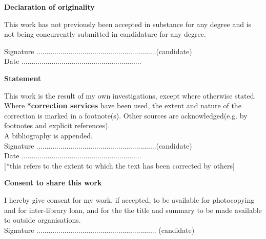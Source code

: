 \thispagestyle{empty}

\begin{center}
    {\LARGE\bf Declaration of originality}
\end{center}

This work has not previously been accepted in substance for any degree and is not being concurrently submitted in candidature for any degree.

\vspace{3em}
Signature ............................................................(candidate) \\

\vspace{1em}
Date ............................................................ \\

\begin{center}
    {\LARGE\bf Statement}
\end{center} 

This work is the result of my own investigations, except where otherwise stated. 
Where \textbf{*correction services} have been used, the extent and nature of the correction is marked in a footnote(s).
Other sources are acknowledged(e.g. by footnotes and explicit references).\\
A bibliography is appended.\\

\vspace{3em}
Signature ............................................................(candidate)  \\

\vspace{1em}
Date ............................................................ \\

[*this refers to the extent to which the text has been corrected by others]\\

\begin{center}
    {\LARGE\bf Consent to share this work}
\end{center}
I hereby give consent for my work, if accepted, to be available for photocopying and for inter-library loan, and for the the title and summary to be made available to outside organisations.\\

\vspace{3em}
Signature ............................................................  (candidate)\\

